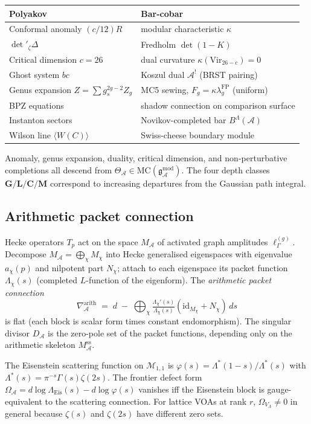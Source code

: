 \documentclass[11pt,reqno]{amsart}
\theoremstyle{definition}
\theoremstyle{remark}
\providecommand{\cA}{\mathcal{A}}
\providecommand{\cM}{\mathcal{M}}
\providecommand{\MC}{\mathrm{MC}}
\providecommand{\gAmod}{\mathfrak{g}^{\mathrm{mod}}_\cA}
\providecommand{\Vir}{\mathrm{Vir}}
\providecommand{\FP}{\mathrm{FP}}
\providecommand{\FP}{\mathrm{FP}}
\numberwithin{equation}{section}
\begin{document}
\begin{center}
\small
\renewcommand{\arraystretch}{1.1}
\begin{tabular}{ll}
\textbf{Polyakov} & \textbf{Bar-cobar}\\ \hline
Conformal anomaly $(c/12)R$ & modular characteristic $\kappa$\\
$\det'_\zeta \Delta$ & Fredholm $\det(1 - K)$\\
Critical dimension $c = 26$ & dual curvature $\kappa(\Vir_{26-c}) = 0$\\
Ghost system $bc$ & Koszul dual $\cA^!$ (BRST pairing)\\
Genus expansion $Z = \sum g_s^{2g-2}Z_g$
 & MC5 sewing, $F_g = \kappa\lambda_g^{\FP}$ (uniform)\\
BPZ equations & shadow connection on comparison surface\\
Instanton sectors & Novikov-completed bar $B^\Lambda(\cA)$\\
Wilson line $\langle W(C)\rangle$ & Swiss-cheese boundary module
\end{tabular}
\end{center}
Anomaly, genus expansion, duality, critical dimension, and
non-perturbative completions all descend from
$\Theta_\cA \in \MC(\gAmod)$. The four depth classes
$\mathbf G/\mathbf L/\mathbf C/\mathbf M$ correspond to
increasing departures from the Gaussian path integral.

\subsection*{Arithmetic packet connection}

Hecke operators $T_p$ act on the space $M_\cA$ of activated
graph amplitudes $\ell_\Gamma^{(g)}$. Decompose
$M_\cA = \bigoplus_\chi M_\chi$ into Hecke generalised
eigenspaces with eigenvalue $a_\chi(p)$ and nilpotent part
$N_\chi$; attach to each eigenspace its packet function
$\Lambda_\chi(s)$ (completed $L$-function of the eigenform).
The \emph{arithmetic packet connection}
\[
\nabla_\cA^{\mathrm{arith}}
\;=\;
d \;-\; \bigoplus_\chi
\tfrac{\Lambda_\chi'(s)}{\Lambda_\chi(s)}
(\mathrm{id}_{M_\chi} + N_\chi)\,ds
\]
is flat (each block is scalar form times constant endomorphism).
The singular divisor $D_\cA$ is the zero-pole set of the packet
functions, depending only on the arithmetic skeleton
$M_\cA^{\mathrm{ss}}$.

The Eisenstein scattering function on $\cM_{1,1}$ is
$\varphi(s) = \Lambda^*(1-s)/\Lambda^*(s)$ with
$\Lambda^*(s) = \pi^{-s}\Gamma(s)\zeta(2s)$. The frontier
defect form
$\Omega_\cA = d\log\Lambda_{\mathrm{Eis}}(s) - d\log\varphi(s)$
vanishes iff the Eisenstein block is gauge-equivalent to the
scattering connection. For lattice VOAs at rank $r$,
$\Omega_{V_\Lambda} \neq 0$ in general because $\zeta(s)$ and
$\zeta(2s)$ have different zero sets.
\end{document}
